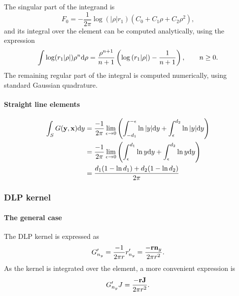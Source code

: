 The singular part of the integrand is
%
\begin{equation}
	F_0 = -\frac{1}{2\pi} \log \left(|\rho| r_1\right) \left( C_0 + C_1 \rho + C_2 \rho^2 \right)
	,
\end{equation}
%
and its integral over the element can be computed analytically, using the expression
%
\begin{equation}
	\int \log(r_1 |\rho|) \rho^n \mathrm{d} \rho = \frac{\rho^{n+1}}{n+1} \left( \log\left(r_1 |\rho|\right) - \frac{1}{n+1} \right)
	, \qquad n \ge 0
	.
\end{equation}
%
The remaining regular part of the integral is computed numerically, using standard Gaussian quadrature.


\paragraph{Straight line elements}

\begin{align}
\int_{S} G({\bf y}, {\bf x}) \mathrm{d} y
& = \frac{-1}{2\pi}\lim_{\epsilon \to 0}
\left( \int_{-d_1}^{-\epsilon} \ln |y| \mathrm{d} y + \int_{\epsilon}^{d_2}  \ln |y| \mathrm{d} y \right) \nonumber \\
& = \frac{-1}{2\pi}\lim_{\epsilon \to 0}
\left( \int_{\epsilon}^{d_1} \ln y \mathrm{d} y + \int_{\epsilon}^{d_2}  \ln y \mathrm{d} y \right) \nonumber \\
&=
\frac{d_1(1-\ln d_1) + d_2(1-\ln d_2)}{2\pi}
\end{align}



\subsubsection{DLP kernel}

\paragraph{The general case}

The DLP kernel is expressed as
%
\begin{equation}
	G'_{n_y} = \frac{-1}{2\pi r} r'_{n_y}
	= \frac{-{\bf r} {\bf n}_y}{2\pi r^2} 
	.
\end{equation}
%
As the kernel is integrated over the element, a more convenient expression is
%
\begin{equation}
	G'_{n_y} J = \frac{-{\bf r} {\bf J}}{2\pi r^2} 
	.
\end{equation}

